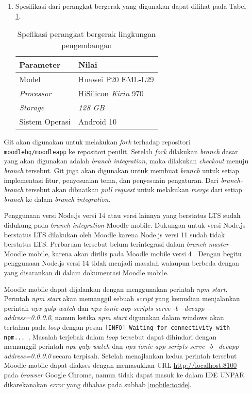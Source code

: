 \begin{enumerate}
\item Spesifikasi dari perangkat bergerak yang digunakan dapat dilihat pada Tabel \ref{spec:mobile}.

\begin{table}[ht]
\caption{Spefikasi perangkat bergerak lingkungan pengembangan}
\centering
\begin{tabular}{|l | l |}
\hline
\textbf{Parameter} & \textbf{Nilai} \\  \hline
Model & Huawei P20 EML-L29 \\ \hline
\textit{Processor}  &  HiSilicon \textit{Kirin} 970 \\ \hline
\textit{Storage} & \textit{128 GB} \\ \hline
Sistem Operasi & Android 10 \\
\hline
\end{tabular}
\label{spec:mobile}
\end{table}

\end{enumerate}

Git akan digunakan untuk melakukan \textit{fork} terhadap repositori \texttt{moodlehq/moodleapp} ke repositori penilit. Setelah \textit{fork} dilakukan \textit{branch} dasar yang akan digunakan adalah \textit{branch integration}, maka dilakukan \textit{checkout} menuju \textit{branch} tersebut. Git juga akan digunakan untuk membuat \textit{branch} untuk setiap implementasi fitur, penyesuaian tema, dan penyesuain pengaturan. Dari \textit{branch-branch} tersebut akan dibuatkan \textit{pull request} untuk melakukan \textit{merge} dari setiap \textit{branch} ke dalam \textit{branch integration}.

Penggunaan versi Node.js versi 14 atau versi lainnya yang berstatus LTS sudah didukung pada \textit{branch integration} Moodle mobile. Dukungan untuk versi Node.js berstatus LTS dilakukan oleh Moodle karena Node.js versi 11 sudah tidak berstatus LTS. Perbaruan tersebut belum terintegrasi dalam \textit{branch master} Moodle mobile, karena akan dirilis pada Moodle mobile versi 4\cite{MoodleTracker:Node11+} . Dengan begitu penggunaan Node.js versi 14 tidak menjadi masalah walaupun berbeda dengan yang disarankan di dalam dokumentasi Moodle mobile. 

Moodle mobile dapat dijalankan dengan menggunakan perintah \textit{npm start}.  Perintah \textit{npm start} akan memanggil sebuah \textit{script} yang kemudian menjalankan perintah \textit{npx gulp watch} dan \textit{npx ionic-app-scripts serve -b --devapp --address=0.0.0.0}, namun ketika \textit{npm start} digunakan dalam windows akan tertahan pada \textit{loop} dengan pesan \texttt{[INFO] Waiting for connectivity with npm...	}. Masalah terjebak dalam \textit{loop} tersebut dapat dihindari dengan memanggil perintah \textit{npx gulp watch} dan \textit{npx ionic-app-scripts serve -b --devapp --address=0.0.0.0} secara terpisah. Setelah menajlankan kedua perintah tersebut Moodle mobile dapat diakses dengan memasukkan URL \url{http://localhost:8100} pada \textit{browser} Google Chrome, namun tidak dapat masuk ke dalam IDE UNPAR dikarekanakan \textit{error} yang dibahas pada subbab \ref{mobile:to:ide}. 

